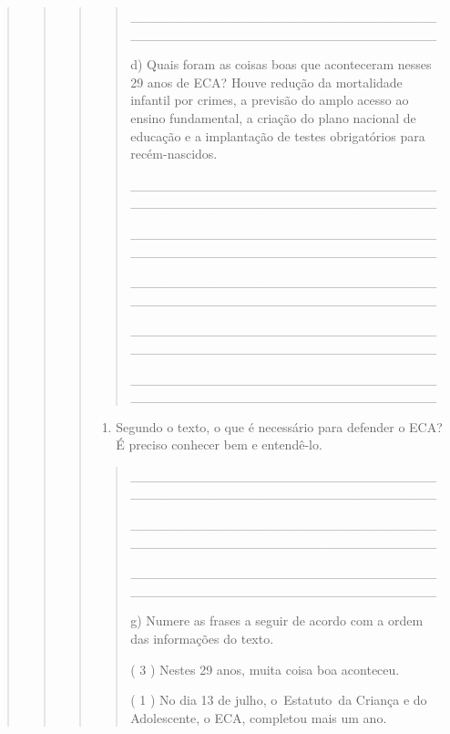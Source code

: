 \begin{quote}
\begin{quote}
\begin{quote}
\begin{quote}
\_\_\_\_\_\_\_\_\_\_\_\_\_\_\_\_\_\_\_\_\_\_\_\_\_\_\_\_\_\_\_\_\_\_\_\_\_\_\_\_\_\_\_\_\_\_\_\_\_\_\_\_\_\_\_\_\_\_\_\_\_\_\_\_

d) Quais foram as coisas boas que aconteceram nesses 29 anos de ECA?
Houve redução da mortalidade infantil por crimes, a previsão do amplo
acesso ao ensino fundamental, a criação do plano nacional de educação e
a implantação de testes obrigatórios para recém-nascidos.

\_\_\_\_\_\_\_\_\_\_\_\_\_\_\_\_\_\_\_\_\_\_\_\_\_\_\_\_\_\_\_\_\_\_\_\_\_\_\_\_\_\_\_\_\_\_\_\_\_\_\_\_\_\_\_\_\_\_\_\_\_\_\_\_

\_\_\_\_\_\_\_\_\_\_\_\_\_\_\_\_\_\_\_\_\_\_\_\_\_\_\_\_\_\_\_\_\_\_\_\_\_\_\_\_\_\_\_\_\_\_\_\_\_\_\_\_\_\_\_\_\_\_\_\_\_\_\_\_

\protect\hypertarget{_Hlk128040463}{}{}\_\_\_\_\_\_\_\_\_\_\_\_\_\_\_\_\_\_\_\_\_\_\_\_\_\_\_\_\_\_\_\_\_\_\_\_\_\_\_\_\_\_\_\_\_\_\_\_\_\_\_\_\_\_\_\_\_\_\_\_\_\_\_\_

\_\_\_\_\_\_\_\_\_\_\_\_\_\_\_\_\_\_\_\_\_\_\_\_\_\_\_\_\_\_\_\_\_\_\_\_\_\_\_\_\_\_\_\_\_\_\_\_\_\_\_\_\_\_\_\_\_\_\_\_\_\_\_\_

\_\_\_\_\_\_\_\_\_\_\_\_\_\_\_\_\_\_\_\_\_\_\_\_\_\_\_\_\_\_\_\_\_\_\_\_\_\_\_\_\_\_\_\_\_\_\_\_\_\_\_\_\_\_\_\_\_\_\_\_\_\_\_\_
\end{quote}

\begin{enumerate}
\def\labelenumi{\alph{enumi})}
\item
  Segundo o texto, o que é necessário para defender o ECA? É preciso
  conhecer bem e entendê-lo.
\end{enumerate}

\begin{quote}
\_\_\_\_\_\_\_\_\_\_\_\_\_\_\_\_\_\_\_\_\_\_\_\_\_\_\_\_\_\_\_\_\_\_\_\_\_\_\_\_\_\_\_\_\_\_\_\_\_\_\_\_\_\_\_\_\_\_\_\_\_\_\_\_

\_\_\_\_\_\_\_\_\_\_\_\_\_\_\_\_\_\_\_\_\_\_\_\_\_\_\_\_\_\_\_\_\_\_\_\_\_\_\_\_\_\_\_\_\_\_\_\_\_\_\_\_\_\_\_\_\_\_\_\_\_\_\_\_

\_\_\_\_\_\_\_\_\_\_\_\_\_\_\_\_\_\_\_\_\_\_\_\_\_\_\_\_\_\_\_\_\_\_\_\_\_\_\_\_\_\_\_\_\_\_\_\_\_\_\_\_\_\_\_\_\_\_\_\_\_\_\_\_

g) Numere as frases a seguir de acordo com a ordem das informações do
texto.

( 3 ) Nestes 29 anos, muita coisa boa aconteceu.

( 1 ) No dia 13 de julho, o~Estatuto~da Criança e do Adolescente, o ECA,
completou mais um ano.


\end{quote}
\end{quote}
\end{quote}
\end{quote}
